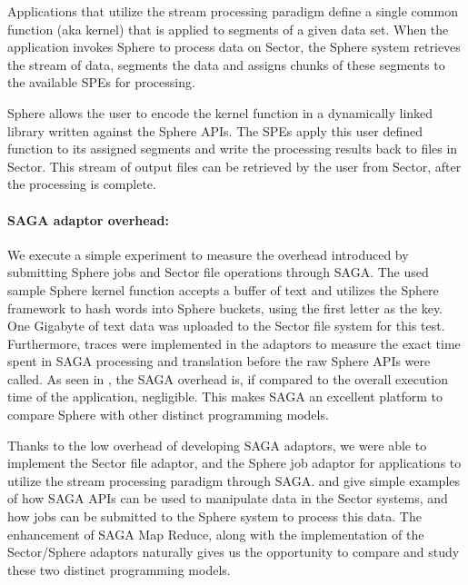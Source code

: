 \documentclass[3p,twocolumn]{elsarticle}
\begin{document}
Applications that utilize the stream processing paradigm define a
single common function (aka kernel) that is applied to segments of a
given data set.  When the application invokes Sphere to process data
on Sector, the Sphere system retrieves the stream of data, segments
the data and assigns chunks of these segments to the available SPEs
for processing.

Sphere allows the user to encode the kernel function in a dynamically
linked library written against the Sphere APIs.  The SPEs apply this
user defined function to its assigned segments and write the
processing results back to files in Sector.  This stream of output
files can be retrieved by the user from Sector, after the processing
is complete. 


\paragraph{SAGA adaptor overhead: }
\label{ssec:overhead}

We execute a simple experiment to measure the overhead introduced by
submitting Sphere jobs and Sector file operations through SAGA.  The
used sample Sphere kernel function accepts a buffer of text and
utilizes the Sphere framework to hash words into Sphere buckets, using
the first letter as the key. One Gigabyte of text data was uploaded to
the Sector file system for this test.  Furthermore, traces were
implemented in the adaptors to measure the exact time spent in SAGA
processing and translation before the raw Sphere APIs were called.  As
seen in , the SAGA overhead is, if compared to the overall
execution time of the application, negligible.  This makes SAGA an
excellent platform to compare Sphere with other distinct programming
models.

Thanks to the low overhead of developing SAGA adaptors, we were able
to implement the Sector file adaptor, and the Sphere job adaptor for
applications to utilize the stream processing paradigm through SAGA.
 and  give simple examples of how SAGA APIs
can be used to manipulate data in the Sector systems, and how jobs can
be submitted to the Sphere system to process this data.  The
enhancement of SAGA Map Reduce, along with the implementation of the
Sector/Sphere adaptors naturally gives us the opportunity to compare
and study these two distinct programming models.
\end{document}
